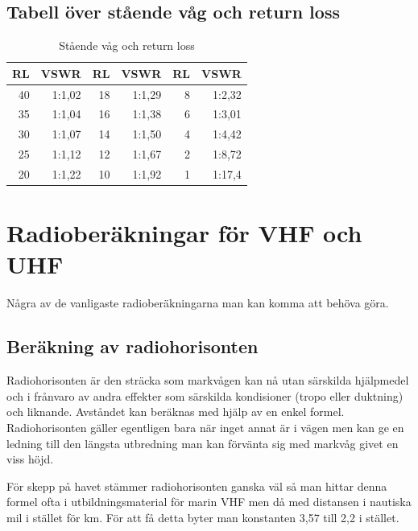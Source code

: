 \subsection{Tabell över stående våg och return loss}

\begin{table}[H]
\centering
\begin{tabular}{rr|rr|rr}
	\textbf{RL} & \textbf{VSWR} & \textbf{RL} & \textbf{VSWR} & \textbf{RL} & \textbf{VSWR} \\ \hline
	         40 &        1:1,02 &          18 &        1:1,29 &           8 &        1:2,32 \\
	         35 &        1:1,04 &          16 &        1:1,38 &           6 &        1:3,01 \\
	         30 &        1:1,07 &          14 &        1:1,50 &           4 &        1:4,42 \\
	         25 &        1:1,12 &          12 &        1:1,67 &           2 &        1:8,72 \\
	         20 &        1:1,22 &          10 &        1:1,92 &           1 &        1:17,4
\end{tabular}
\caption{Stående våg och return loss}
\label{tab:vswr-rl}
\end{table}

\section{Radioberäkningar för VHF och UHF}

Några av de vanligaste radioberäkningarna man kan komma att behöva göra.

\subsection{Beräkning av radiohorisonten}

Radiohorisonten är den sträcka som markvågen kan nå utan särskilda hjälpmedel
och i frånvaro av andra effekter som särskilda kondisioner (tropo eller
duktning) och liknande. Avståndet kan beräknas med hjälp av en enkel formel.
Radiohorisonten gäller egentligen bara när inget annat är i vägen men kan ge
en ledning till den längsta utbredning man kan förvänta sig med markvåg givet
en viss höjd.

För skepp på havet stämmer radiohorisonten ganska väl så man hittar denna
formel ofta i utbildningsmaterial för marin VHF men då med distansen i
nautiska mil i stället för km. För att få detta byter man konstanten 3,57 till
2,2 i stället.

